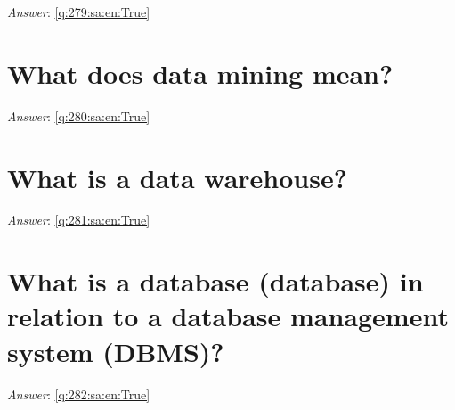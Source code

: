 \documentclass[a4paper,11pt,oneside]{book}
\begin{document}
\begin{sloppypar}
\label{q:279:sa:en:False}

\vspace{2cm}

\noindent\makebox[\textwidth]{\hrulefill}

\vspace{1cm}

\textit{Answer}: \autoref{q:279:sa:en:True}



\section{What does data mining mean?}

\label{q:280:sa:en:False}

\vspace{2cm}

\noindent\makebox[\textwidth]{\hrulefill}

\vspace{1cm}

\textit{Answer}: \autoref{q:280:sa:en:True}



\section{What is a data warehouse?}

\label{q:281:sa:en:False}

\vspace{2cm}

\noindent\makebox[\textwidth]{\hrulefill}

\vspace{1cm}

\textit{Answer}: \autoref{q:281:sa:en:True}



\section{What is a database (database) in relation to a database management system (DBMS)?}

\label{q:282:sa:en:False}

\vspace{2cm}

\noindent\makebox[\textwidth]{\hrulefill}

\vspace{1cm}

\textit{Answer}: \autoref{q:282:sa:en:True}




\end{sloppypar}
\end{document}
